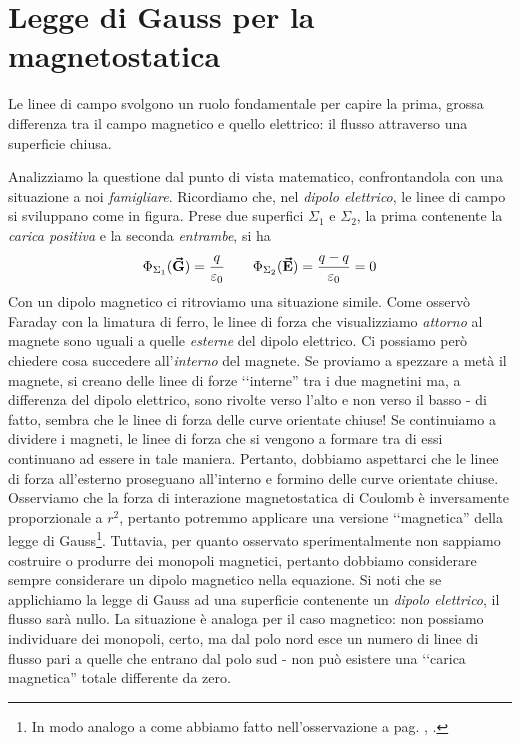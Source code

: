 \section{Legge di Gauss per la magnetostatica}
Le linee di campo svolgono un ruolo fondamentale per capire la prima, grossa differenza tra il campo magnetico e quello elettrico: il flusso attraverso una superficie chiusa.

Analizziamo la questione dal punto di vista matematico, confrontandola con una situazione a noi \textit{famigliare}. Ricordiamo che, nel \textit{dipolo elettrico}, le linee di campo si sviluppano come in figura.
Prese due superfici $\Sigma_1$ e $\Sigma_2$, la prima contenente la \textit{carica positiva} e la seconda \textit{entrambe}, si ha
\begin{equation*}
	\Phi_{\Sigma_1}(\vb*{\va{G}})=\frac{q}{\varepsilon_0}\qquad\Phi_{\Sigma_2}(\vb*{\va{E}})=\frac{q-q}{\varepsilon_0}=0
\end{equation*}
Con un dipolo magnetico ci ritroviamo una situazione simile.
Come osservò Faraday con la limatura di ferro, le linee di forza che visualizziamo \textit{attorno} al magnete sono uguali a quelle \textit{esterne} del dipolo elettrico. Ci possiamo però chiedere cosa succedere all'\textit{interno} del magnete. Se proviamo a spezzare a metà il magnete, si creano delle linee di forze ‘‘interne'' tra i due magnetini ma, a differenza del dipolo elettrico, sono rivolte verso l'alto e non verso il basso - di fatto, sembra che le linee di forza delle curve orientate chiuse!
Se continuiamo a dividere i magneti, le linee di forza che si vengono a formare tra di essi continuano ad essere in tale maniera. Pertanto, dobbiamo aspettarci che le linee di forza all'esterno proseguano all'interno e formino delle curve orientate chiuse.
Osserviamo che la forza di interazione magnetostatica di Coulomb è inversamente proporzionale a $r^2$, pertanto potremmo applicare una versione ‘‘magnetica'' della legge di Gauss\footnote{In modo analogo a come abbiamo fatto nell'osservazione a pag. \pageref{LeggeGaussMoltoGeneralizzata}, .}. Tuttavia, per quanto osservato sperimentalmente non sappiamo costruire o produrre dei monopoli magnetici, pertanto dobbiamo considerare sempre considerare un dipolo magnetico nella equazione.
Si noti che se applichiamo la legge di Gauss ad una superficie contenente un \textit{dipolo elettrico}, il flusso sarà nullo. La situazione è analoga per il caso magnetico: non possiamo individuare dei monopoli, certo, ma dal polo nord esce un numero di linee di flusso pari a quelle che entrano dal polo sud - non può esistere una ‘‘carica magnetica'' totale differente da zero.\\
